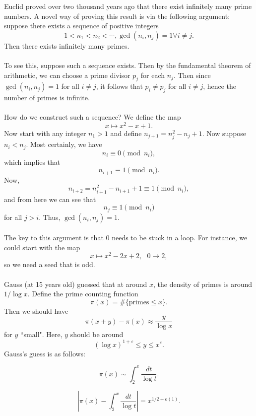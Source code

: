 \documentclass[12pt,amsfont]{amsart}
\begin{document}
Euclid proved over two thousand years ago that there exist infinitely many prime numbers. A novel way of proving this result is via the following argument: suppose there exists a sequence of positive integers 
\[1 < n_1 < n_2 < \cdots , \gcd(n_i, n_j) = 1 \forall i \ne j.\]
Then there exists infinitely many primes. \\ \\
To see this, suppose such a sequence exists. Then by the fundamental theorem of arithmetic, we can choose a prime divisor $p_j$ for each $n_j$. Then since $\gcd(n_i, n_j) = 1$ for all $i \ne j$, it follows that $p_i \ne p_j$ for all $i \ne j$, hence the number of primes is infinite. \\ \\
How do we construct such a sequence? We define the map
\[x \mapsto x^2 - x + 1.\]
Now start with any integer $n_1 > 1$ and define $n_{j+1} = n_j^2 - n_j + 1$. Now suppose $n_i < n_j$. Most certainly, we have
\[n_i \equiv 0 \pmod{n_i},\]
which implies that
\[n_{i+1} \equiv 1 \pmod{n_i}.\]
Now, 
\[n_{i+2} = n_{i+1}^2 - n_{i+1} + 1 \equiv 1 \pmod{n_i},\]
and from here we can see that
\[n_j \equiv 1 \pmod{n_i}\]
for all $j > i$. Thus, $\gcd(n_i, n_j) = 1$. \\ \\
The key to this argument is that $0$ needs to be stuck in a loop. For instance, we could start with the map
\[x \mapsto x^2 - 2x + 2, \text{ } 0 \rightarrow 2, \]
so we need a seed that is odd. \\ \\
Gauss (at 15 years old) guessed that at around $x$, the density of primes is around $1/\log x$. Define the prime counting function
\[\pi(x) = \# \{\text{primes} \leq x\}.\]
Then we should have
\[\pi(x+y) - \pi(x) \approx \frac{y}{\log x} \]
for $y$ ``small". Here, $y$ should be around
\[(\log x)^{1 + \varepsilon} \leq y \leq x^\varepsilon.\]
Gauss's guess is as follows:

\[\pi(x) \sim \int_2^x \frac{dt}{\log t}.\]

\begin{cnj}  \[\left \lvert\pi(x) - \int_2^x \frac{dt}{\log t}\right \rvert = x^{1/2 + o(1)}.\]
\end{cnj}
\end{document}

